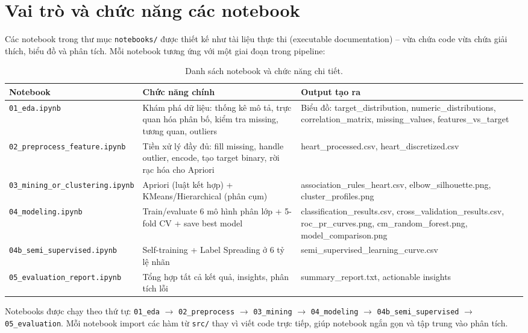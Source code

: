 \section{Vai trò và chức năng các notebook}

Các notebook trong thư mục \texttt{notebooks/} được thiết kế như tài liệu thực thi (executable documentation) -- vừa chứa code vừa chứa giải thích, biểu đồ và phân tích. Mỗi notebook tương ứng với một giai đoạn trong pipeline:

\begin{table}[H]
\centering
\caption{Danh sách notebook và chức năng chi tiết.}
\label{tab:notebooks}
\small
\begin{tabular}{|l|p{4cm}|p{5.5cm}|}
\hline
\textbf{Notebook} & \textbf{Chức năng chính} & \textbf{Output tạo ra} \\ \hline
\texttt{01\_eda.ipynb} & Khám phá dữ liệu: thống kê mô tả, trực quan hóa phân bố, kiểm tra missing, tương quan, outliers & Biểu đồ: target\_distribution, numeric\_distributions, correlation\_matrix, missing\_values, features\_vs\_target \\ \hline
\texttt{02\_preprocess\_feature.ipynb} & Tiền xử lý đầy đủ: fill missing, handle outlier, encode, tạo target binary, rời rạc hóa cho Apriori & heart\_processed.csv, heart\_discretized.csv \\ \hline
\texttt{03\_mining\_or\_clustering.ipynb} & Apriori (luật kết hợp) + KMeans/Hierarchical (phân cụm) & association\_rules\_heart.csv, elbow\_silhouette.png, cluster\_profiles.png \\ \hline
\texttt{04\_modeling.ipynb} & Train/evaluate 6 mô hình phân lớp + 5-fold CV + save best model & classification\_results.csv, cross\_validation\_results.csv, roc\_pr\_curves.png, cm\_random\_forest.png, model\_comparison.png \\ \hline
\texttt{04b\_semi\_supervised.ipynb} & Self-training + Label Spreading ở 6 tỷ lệ nhãn & semi\_supervised\_learning\_curve.csv \\ \hline
\texttt{05\_evaluation\_report.ipynb} & Tổng hợp tất cả kết quả, insights, phân tích lỗi & summary\_report.txt, actionable insights \\ \hline
\end{tabular}
\end{table}

Notebooks được chạy theo thứ tự: \texttt{01\_eda} $\rightarrow$ \texttt{02\_preprocess} $\rightarrow$ \texttt{03\_mining} $\rightarrow$ \texttt{04\_modeling} $\rightarrow$ \texttt{04b\_semi\_supervised} $\rightarrow$ \texttt{05\_evaluation}. Mỗi notebook import các hàm từ \texttt{src/} thay vì viết code trực tiếp, giúp notebook ngắn gọn và tập trung vào phân tích.

